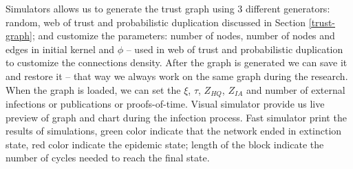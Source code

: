 \documentclass[nostrict]{szablonPG}
\begin{document}
Simulators allows us to generate the trust graph using 3 different generators: random, web of trust and probabilistic duplication discussed in Section \ref{trust-graph}; and customize the parameters: number of nodes, number of nodes and edges in initial kernel and $\phi$ -- used in web of trust and probabilistic duplication to customize the connections density. After the graph is generated we can save it and restore it -- that way we always work on the same graph during the research. 
When the graph is loaded, we can set the $\xi$, $\tau$, $Z_{HQ}$, $Z_{IA}$ and number of external infections or publications or proofs-of-time. 
Visual simulator provide us live preview of graph and chart during the infection process.  
Fast simulator print the results of simulations, green color indicate that the network ended in extinction state, red color indicate the epidemic state; length of the block indicate the number of cycles needed to reach the final state.
\end{document}
